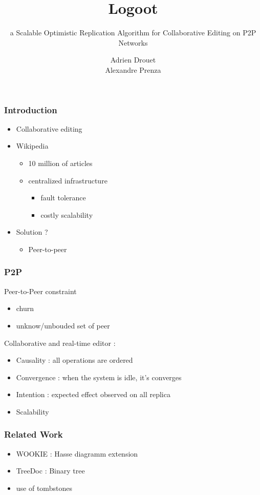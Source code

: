 \documentclass[14pt]{beamer}
\title{Logoot}
\subtitle{a Scalable Optimistic Replication Algorithm for Collaborative Editing on P2P Networks}
\author{Adrien Drouet\\
        Alexandre Prenza}
\begin{document}
  \begin{frame}
    \titlepage
  \end{frame}

	\begin{frame}
		\frametitle{Introduction}
		\begin{itemize}
			\item<1-> Collaborative editing
			\item <2->Wikipedia
				\begin{itemize}
					\item<3-> 10 million of articles
					\item<3-> centralized infrastructure
					\begin{itemize}
						\item<4-> fault tolerance
						\item<4-> costly scalability
					\end{itemize}
				\end{itemize}
			\item<5-> Solution ?
			\begin{itemize}
						\item<6-> Peer-to-peer
			\end{itemize}
		\end{itemize}
	\end{frame}

	\begin{frame}
		\frametitle{P2P}
		Peer-to-Peer constraint
		\begin{itemize}
			\item churn
			\item unknow/unbouded set of peer
		\end{itemize}
		
		Collaborative and real-time editor :
		\begin{itemize}
			\item<2-> Causality : all operations are ordered
			\item<2-> Convergence : when the system is idle, it's converges
			\item<2-> Intention : expected effect observed on all replica
			\item<2-> Scalability
		\end{itemize}
	\end{frame}

	\begin{frame}
	  \frametitle{Related Work}
		\begin{itemize}
			\item<1-> WOOKIE : Hasse diagramm extension
			\item<1-> TreeDoc : Binary tree
			\item<2-> use of tombstones
		\end{itemize}
	\end{frame}
\end{document}
